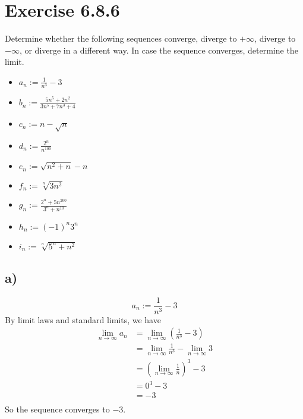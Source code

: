 \documentclass{article}
\newcommand{\limn}{\lim_{n\to\infty}}
\theoremstyle{mytheoremstyle}
\theoremstyle{mytheoremstyle}
\theoremstyle{myproblemstyle}
\begin{document}
    \section{Exercise 6.8.6}
    \begin{problem}
        Determine whether the following sequences converge, diverge to $+\infty$, diverge to $-\infty$, or diverge in a different way.
        In case the sequence converges, determine the limit.
        \begin{itemize}
            \item $a_n := \frac{1}{n^3} - 3$
            \item $b_n := \frac{5n^5 + 2n^2}{3n^5+7n^3+4}$
            \item $c_n := n - \sqrt{n}$
            \item $d_n := \frac{2^n}{n^{100}}$
            \item $e_n := \sqrt{n^2+n}-n$
            \item $f_n := \sqrt[n]{3n^2}$
            \item $g_n := \frac{2^n + 5n^200}{3^n+n^10}$
            \item $h_n := (-1)^n3^n$
            \item $i_n := \sqrt[n]{5^n + n^2}$
        \end{itemize}
    \end{problem}
    \subsection{a)}
    $$a_n := \frac{1}{n^3} - 3$$
        By limit laws and standard limits, we have
        \begin{align*}
            \limn a_n &= \limn\left(\frac{1}{n^3} - 3\right) \\
                    &= \limn\frac{1}{n^3} - \limn 3 \\
                    &= \left(\limn\frac{1}{n}\right)^3 - 3 \\
                    &= 0^3 - 3 \\
                    &= -3 \\
        \end{align*}
        So the sequence converges to $-3$.
\end{document}
